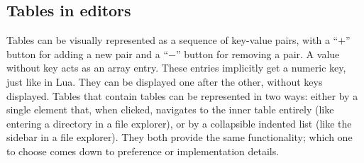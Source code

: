\subsection{Tables in editors}
Tables can be visually represented as a sequence of key-value pairs, with a ``$+$'' button for adding a new pair and a ``$-$'' button for removing a pair. A value without key acts as an array entry. These entries implicitly get a numeric key, just like in Lua. They can be displayed one after the other, without keys displayed. Tables that contain tables can be represented in two ways: either by a single element that, when clicked, navigates to the inner table entirely (like entering a directory in a file explorer), or by a collapsible indented list (like the sidebar in a file explorer). They both provide the same functionality; which one to choose comes down to preference or implementation details.
